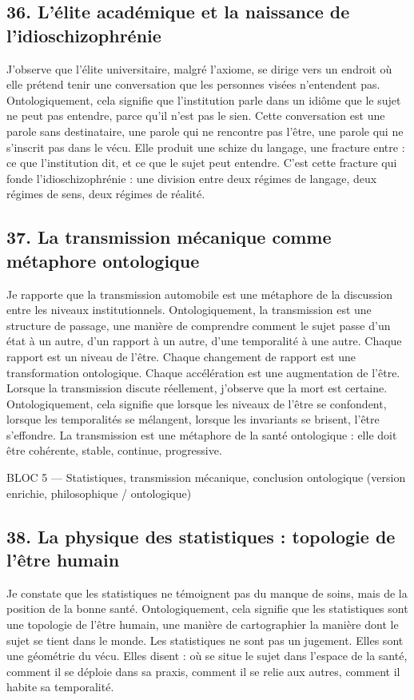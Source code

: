 \documentclass[12pt,letterpaper,oneside]{article}
\begin{document}
\subsection*{36. L’élite académique et la naissance de l’idioschizophrénie}
J’observe que l’élite universitaire, malgré l’axiome, se dirige vers un endroit où elle prétend tenir une conversation que les personnes visées n’entendent pas. Ontologiquement, cela signifie que l’institution parle dans un idiôme que le sujet ne peut pas entendre, parce qu’il n’est pas le sien.
Cette conversation est une parole sans destinataire, une parole qui ne rencontre pas l’être, une parole qui ne s’inscrit pas dans le vécu.
Elle produit une schize du langage, une fracture entre :
	ce que l’institution dit,
	et ce que le sujet peut entendre.
C’est cette fracture qui fonde l’idioschizophrénie : une division entre deux régimes de langage, deux régimes de sens, deux régimes de réalité.

\subsection*{37. La transmission mécanique comme métaphore ontologique}
Je rapporte que la transmission automobile est une métaphore de la discussion entre les niveaux institutionnels. Ontologiquement, la transmission est une structure de passage, une manière de comprendre comment le sujet passe d’un état à un autre, d’un rapport à un autre, d’une temporalité à une autre.
Chaque rapport est un niveau de l’être. Chaque changement de rapport est une transformation ontologique. Chaque accélération est une augmentation de l’être.
Lorsque la transmission discute réellement, j’observe que la mort est certaine. Ontologiquement, cela signifie que lorsque les niveaux de l’être se confondent, lorsque les temporalités se mélangent, lorsque les invariants se brisent, l’être s’effondre.
La transmission est une métaphore de la santé ontologique : elle doit être cohérente, stable, continue, progressive.

BLOC 5 — Statistiques, transmission mécanique, conclusion ontologique (version enrichie, philosophique / ontologique)

\subsection*{38. La physique des statistiques : topologie de l’être humain}
Je constate que les statistiques ne témoignent pas du manque de soins, mais de la position de la bonne santé. Ontologiquement, cela signifie que les statistiques sont une topologie de l’être humain, une manière de cartographier la manière dont le sujet se tient dans le monde.
Les statistiques ne sont pas un jugement. Elles sont une géométrie du vécu.
Elles disent :
	où se situe le sujet dans l’espace de la santé,
	comment il se déploie dans sa praxis,
	comment il se relie aux autres,
	comment il habite sa temporalité.
\end{document}
